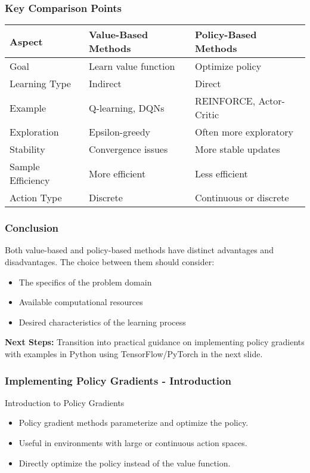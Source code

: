 \documentclass[aspectratio=169]{beamer}
\begin{document}
\begin{frame}[fragile]
    \frametitle{Key Comparison Points}

    \begin{center}
    \begin{tabular}{|l|l|l|}
    \hline
    \textbf{Aspect} & \textbf{Value-Based Methods} & \textbf{Policy-Based Methods} \\
    \hline
    Goal & Learn value function & Optimize policy \\
    \hline
    Learning Type & Indirect & Direct \\
    \hline
    Example & Q-learning, DQNs & REINFORCE, Actor-Critic \\
    \hline
    Exploration & Epsilon-greedy & Often more exploratory \\
    \hline
    Stability & Convergence issues & More stable updates \\
    \hline
    Sample Efficiency & More efficient & Less efficient \\
    \hline
    Action Type & Discrete & Continuous or discrete \\
    \hline
    \end{tabular}
    \end{center}
\end{frame}

\begin{frame}[fragile]
    \frametitle{Conclusion}

    Both value-based and policy-based methods have distinct advantages and disadvantages. The choice between them should consider:
    \begin{itemize}
        \item The specifics of the problem domain
        \item Available computational resources
        \item Desired characteristics of the learning process
    \end{itemize}
    
    \textbf{Next Steps:} Transition into practical guidance on implementing policy gradients with examples in Python using TensorFlow/PyTorch in the next slide.
\end{frame}

\begin{frame}[fragile]
    \frametitle{Implementing Policy Gradients - Introduction}
    \begin{block}{Introduction to Policy Gradients}
        \begin{itemize}
            \item Policy gradient methods parameterize and optimize the policy.
            \item Useful in environments with large or continuous action spaces.
            \item Directly optimize the policy instead of the value function.
        \end{itemize}
    \end{block}
\end{frame}
\end{document}

